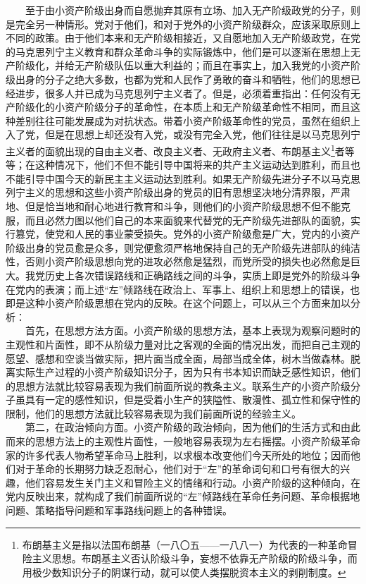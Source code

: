 \documentclass[cn,11pt,chinese]{elegantbook}
\begin{document}
　　至于由小资产阶级出身而自愿抛弃其原有立场、加入无产阶级政党的分子，则是完全另一种情形。党对于他们，和对于党外的小资产阶级群众，应该采取原则上不同的政策。由于他们本来和无产阶级相接近，又自愿地加入无产阶级政党，在党的马克思列宁主义教育和群众革命斗争的实际锻炼中，他们是可以逐渐在思想上无产阶级化，并给无产阶级队伍以重大利益的；而且在事实上，加入我党的小资产阶级出身的分子之绝大多数，也都为党和人民作了勇敢的奋斗和牺牲，他们的思想已经进步，很多人并已成为马克思列宁主义者了。但是，必须着重指出：任何没有无产阶级化的小资产阶级分子的革命性，在本质上和无产阶级革命性不相同，而且这种差别往往可能发展成为对抗状态。带着小资产阶级革命性的党员，虽然在组织上入了党，但是在思想上却还没有入党，或没有完全入党，他们往往是以马克思列宁主义者的面貌出现的自由主义者、改良主义者、无政府主义者、布朗基主义\footnote[48]{ 布朗基主义是指以法国布朗基（一八〇五——一八八一）为代表的一种革命冒险主义思想。布朗基主义否认阶级斗争，妄想不依靠无产阶级的阶级斗争，而用极少数知识分子的阴谋行动，就可以使人类摆脱资本主义的剥削制度。}者等等；在这种情况下，他们不但不能引导中国将来的共产主义运动达到胜利，而且也不能引导中国今天的新民主主义运动达到胜利。如果无产阶级先进分子不以马克思列宁主义的思想和这些小资产阶级出身的党员的旧有思想坚决地分清界限，严肃地、但是恰当地和耐心地进行教育和斗争，则他们的小资产阶级思想不但不能克服，而且必然力图以他们自己的本来面貌来代替党的无产阶级先进部队的面貌，实行篡党，使党和人民的事业蒙受损失。党外的小资产阶级愈是广大，党内的小资产阶级出身的党员愈是众多，则党便愈须严格地保持自己的无产阶级先进部队的纯洁性，否则小资产阶级思想向党的进攻必然愈是猛烈，而党所受的损失也必然愈是巨大。我党历史上各次错误路线和正确路线之间的斗争，实质上即是党外的阶级斗争在党内的表演；而上述“左”倾路线在政治上、军事上、组织上和思想上的错误，也即是这种小资产阶级思想在党内的反映。在这个问题上，可以从三个方面来加以分析：\\
　　首先，在思想方法方面。小资产阶级的思想方法，基本上表现为观察问题时的主观性和片面性，即不从阶级力量对比之客观的全面的情况出发，而把自己主观的愿望、感想和空谈当做实际，把片面当成全面，局部当成全体，树木当做森林。脱离实际生产过程的小资产阶级知识分子，因为只有书本知识而缺乏感性知识，他们的思想方法就比较容易表现为我们前面所说的教条主义。联系生产的小资产阶级分子虽具有一定的感性知识，但是受着小生产的狭隘性、散漫性、孤立性和保守性的限制，他们的思想方法就比较容易表现为我们前面所说的经验主义。\\
　　第二，在政治倾向方面。小资产阶级的政治倾向，因为他们的生活方式和由此而来的思想方法上的主观性片面性，一般地容易表现为左右摇摆。小资产阶级革命家的许多代表人物希望革命马上胜利，以求根本改变他们今天所处的地位；因而他们对于革命的长期努力缺乏忍耐心，他们对于“左”的革命词句和口号有很大的兴趣，他们容易发生关门主义和冒险主义的情绪和行动。小资产阶级的这种倾向，在党内反映出来，就构成了我们前面所说的“左”倾路线在革命任务问题、革命根据地问题、策略指导问题和军事路线问题上的各种错误。\\
\end{document}
